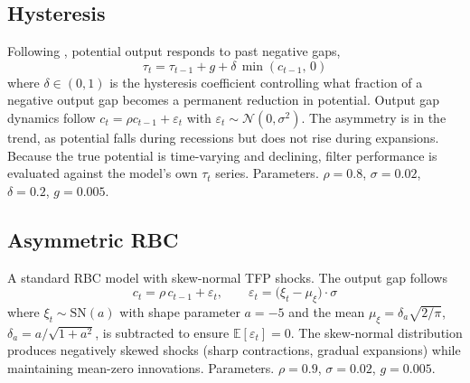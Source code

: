 \documentclass[10pt]{article}
\begin{document}
\subsection*{Hysteresis}

Following \citet{blanchard_summers1986}, potential output responds to past negative gaps,
\begin{equation}
\tau_t = \tau_{t-1} + g + \delta \, \min(c_{t-1},\, 0)
\end{equation}
where $\delta \in (0,1)$ is the hysteresis coefficient controlling what fraction of a negative output gap becomes a permanent reduction in potential. Output gap dynamics follow $c_t = \rho c_{t-1} + \varepsilon_t$ with $\varepsilon_t \sim \mathcal{N}(0, \sigma^2)$. The asymmetry is in the trend, as potential falls during recessions but does not rise during expansions. Because the true potential is time-varying and declining, filter performance is evaluated against the model's own $\tau_t$ series. Parameters. $\rho = 0.8$, $\sigma = 0.02$, $\delta = 0.2$, $g = 0.005$.

\subsection*{Asymmetric RBC}
\label{app:asymrbc}

A standard RBC model with skew-normal TFP shocks. The output gap follows
\begin{equation}
c_t = \rho \, c_{t-1} + \varepsilon_t, \qquad \varepsilon_t = \bigl(\xi_t - \mu_\xi\bigr) \cdot \sigma
\end{equation}
where $\xi_t \sim \text{SN}(a)$ with shape parameter $a = -5$ and the mean $\mu_\xi = \delta_a \sqrt{2/\pi}$, $\delta_a = a/\sqrt{1+a^2}$, is subtracted to ensure $\mathbb{E}[\varepsilon_t] = 0$. The skew-normal distribution produces negatively skewed shocks (sharp contractions, gradual expansions) while maintaining mean-zero innovations. Parameters. $\rho = 0.9$, $\sigma = 0.02$, $g = 0.005$.
\end{document}
